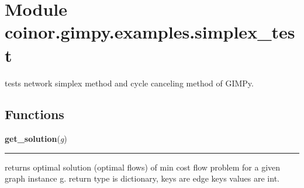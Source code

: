 %
%
%


\section{Module coinor.gimpy.examples.simplex\_test}

    \label{coinor:gimpy:examples:simplex_test}
tests network simplex method and cycle canceling method of GIMPy.



  \subsection{Functions}

    \label{coinor:gimpy:examples:simplex_test:get_solution}

    \vspace{0.5ex}

\hspace{.8\funcindent}\begin{boxedminipage}{\funcwidth}

    \raggedright \textbf{get\_solution}(\textit{g})

    \vspace{-1.5ex}

    \rule{\textwidth}{0.5\fboxrule}
\setlength{\parskip}{2ex}
    returns optimal solution (optimal flows) of min cost flow problem for a
    given graph instance g. return type is dictionary, keys are edge keys 
    values are int.

\setlength{\parskip}{1ex}
    \end{boxedminipage}

